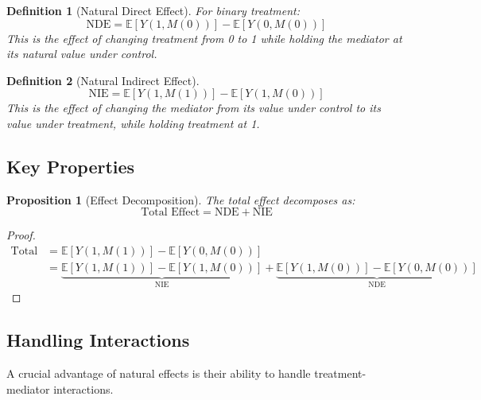 \documentclass[11pt,a4paper]{article}
\newtheorem{proposition}[theorem]{Proposition}
\newtheorem{definition}{Definition}
\newcommand{\E}{\mathbb{E}}
\begin{document}
\begin{definition}[Natural Direct Effect]
For binary treatment:
\begin{equation}
\text{NDE} = \E[Y(1,M(0))] - \E[Y(0,M(0))]
\end{equation}
This is the effect of changing treatment from 0 to 1 while holding the mediator at its natural value under control.
\end{definition}

\begin{definition}[Natural Indirect Effect]
\begin{equation}
\text{NIE} = \E[Y(1,M(1))] - \E[Y(1,M(0))]
\end{equation}
This is the effect of changing the mediator from its value under control to its value under treatment, while holding treatment at 1.
\end{definition}

\subsection{Key Properties}

\begin{proposition}[Effect Decomposition]
The total effect decomposes as:
\begin{equation}
\text{Total Effect} = \text{NDE} + \text{NIE}
\end{equation}
\end{proposition}

\begin{proof}
\begin{align}
\text{Total} &= \E[Y(1,M(1))] - \E[Y(0,M(0))] \\
&= \underbrace{\E[Y(1,M(1))] - \E[Y(1,M(0))]}_{\text{NIE}} + \underbrace{\E[Y(1,M(0))] - \E[Y(0,M(0))]}_{\text{NDE}}
\end{align}
\end{proof}

\subsection{Handling Interactions}

A crucial advantage of natural effects is their ability to handle treatment-mediator interactions.
\end{document}
